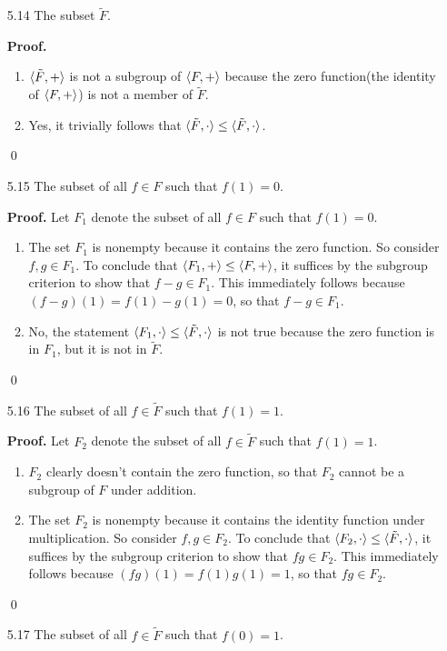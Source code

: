 \begin{enumerate}
   \item[5.14] The subset $\tilde{F}$.

      \textbf{Proof.}

      \begin{enumerate}
         \item $\langle \tilde{F}, + \rangle$ is not a subgroup of $\langle F, + \rangle$ because 
               the zero function(the identity of $\langle F, + \rangle$) is not a member
               of $\tilde{F}$.
         \item Yes, it trivially follows that
               $\langle \tilde{F}, \cdot \rangle \le \langle \tilde{F}, \cdot \rangle$.
      \end{enumerate} \qed
   \item[5.15] The subset of all $f \in F$ such that $f(1) = 0$.

      \textbf{Proof.} Let $F_1$ denote the subset of all $f \in F$ such that 
      $f(1) = 0$.

      \begin{enumerate}
         \item The set $F_1$ is nonempty because it contains the zero function. 
               So consider $f, g \in F_1$. To conclude that
               $\langle F_1, + \rangle \le \langle F, + \rangle$, it suffices by the subgroup 
               criterion to show that $f - g \in F_1$. This immediately follows
               because $(f - g)(1) = f(1) - g(1) = 0$, so that $f - g \in F_1$.
         \item No, the statement $\langle F_1, \cdot \rangle \le \langle \tilde{F}, \cdot \rangle$
               is not true because the zero function is in $F_1$, but it is not
               in $\tilde{F}$.
      \end{enumerate} \qed
   \item[5.16] The subset of all $f \in \tilde{F}$ such that $f(1) = 1$.

      \textbf{Proof.} Let $F_2$ denote the subset of all $f \in \tilde{F}$ such 
      that $f(1) = 1$.

      \begin{enumerate}
         \item $F_2$ clearly doesn't contain the zero function, so that
               $F_2$ cannot be a subgroup of $F$ under addition.
         \item The set $F_2$ is nonempty because it contains the identity       
               function under multiplication. So consider $f, g \in F_2$. To 
               conclude that $\langle F_2, \cdot \rangle \le \langle \tilde{F}, \cdot \rangle$, it 
               suffices by the subgroup criterion to show that $fg \in F_2$. 
               This immediately follows because $(fg)(1) = f(1)g(1) = 1$, so 
               that $fg \in F_2$.
      \end{enumerate} \qed
   \item[5.17] The subset of all $f \in \tilde{F}$ such that $f(0) = 1$.


\end{enumerate}
